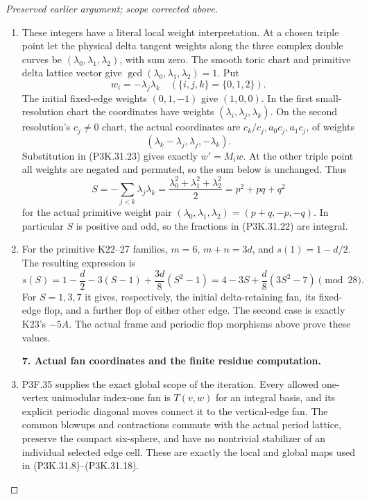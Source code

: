 \begin{proof}[Preserved earlier argument; scope corrected above]
\begin{enumerate}[label=\arabic*.]
\item These integers have a literal local weight interpretation.
At a chosen triple point let the physical delta tangent
weights along the three complex double curves be
\((\lambda_0,\lambda_1,\lambda_2)\), with sum zero.
The smooth toric chart and primitive delta lattice vector
give \(\gcd(\lambda_0,\lambda_1,\lambda_2)=1\).
Put
\[
              w_i=-\lambda_j\lambda_k\quad
                     (\{i,j,k\}=\{0,1,2\}).
                                                        \tag{P3K.31.23}
\]
The initial fixed-edge weights \((0,1,-1)\) give
\((1,0,0)\). In the first small-resolution chart the
coordinates have weights \((\lambda_i,\lambda_j,\lambda_k)\).
On the second resolution's \(c_j\ne0\) chart, the actual
coordinates are \(c_k/c_j,a_0c_j,a_1c_j\), of weights
\[
                  (\lambda_k-\lambda_j,\lambda_j,-\lambda_k).
                                                        \tag{P3K.31.24}
\]
Substitution in (P3K.31.23) gives exactly \(w'=M_iw\).
At the other triple point all weights are negated and
permuted, so the sum below is unchanged. Thus
\[
             S=-\sum_{j<k}\lambda_j\lambda_k
               =\frac{\lambda_0^2+\lambda_1^2+\lambda_2^2}{2}
               =p^2+pq+q^2
                                                        \tag{P3K.31.25}
\]
for the actual primitive weight pair
\((\lambda_0,\lambda_1,\lambda_2)=(p+q,-p,-q)\).
In particular \(S\) is positive and odd, so the fractions
in (P3K.31.22) are integral.

\item For the primitive K22--27 families, \(m=6\), \(m+n=3d\),
and \(s(1)=1-d/2\). The resulting expression is
\[
        s(S)=1-\frac d2-3(S-1)+\frac{3d}{8}(S^2-1)
             =4-3S+\frac d8(3S^2-7)\pmod{28}.
                                                        \tag{P3K.31.26}
\]
For \(S=1,3,7\) it gives, respectively, the initial
delta-retaining fan, its fixed-edge flop, and a further
flop of either other edge. The second case is exactly
K23's \(-5A\). The actual frame and periodic flop morphisms above prove these values.

\par\medskip\noindent\textbf{7. Actual fan coordinates and the finite residue computation.}\enspace

\item P3F.35 supplies the exact global scope of the iteration.
Every allowed one-vertex unimodular index-one fan is
\(T(v,w)\) for an integral basis, and its explicit
periodic diagonal moves connect it to the vertical-edge
fan. The common blowups and contractions commute with
the actual period lattice, preserve the compact
six-sphere, and have no nontrivial stabilizer of an
individual selected edge cell. These are exactly the
local and global maps used in (P3K.31.8)--(P3K.31.18).


\end{enumerate}
\end{proof}
